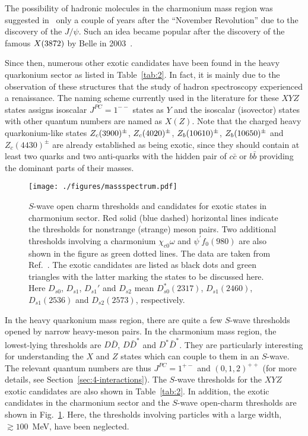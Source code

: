 The possibility of hadronic molecules in the charmonium mass region was 
suggested in~\cite{Voloshin:1976ap,DeRujula:1976zlg} only a couple of years  
after the ``November Revolution'' due to the discovery of the $J/\psi$. Such 
an idea became popular after the discovery of the famous $X(3872)$ by Belle in
2003~\cite{Choi:2003ue}.

Since then, numerous other exotic candidates have been found in the heavy
quarkonium sector as listed in Table~\ref{tab:2}. In fact, it is mainly due to 
the observation of these structures that the study of hadron spectroscopy 
experienced a renaissance.
The naming scheme currently used in the literature for these $XYZ$ states 
assigns isoscalar $J^{PC}=1^{--}$ states as $Y$ and
the isoscalar (isovector) states with other quantum numbers are named as $X 
(Z)$. Note that the charged heavy quarkonium-like states $Z_c(3900)^\pm$, 
$Z_c(4020)^\pm$, $Z_b(10610)^\pm$, $Z_b(10650)^\pm$ and $Z_c
(4430)^\pm$ are already established as being exotic, since they should contain 
at least two quarks and two anti-quarks with the hidden pair of $c\bar c$ or 
$b\bar b$ providing the dominant parts of their masses.


\begin{figure}[tbh]
\begin{center}
 \texttt{[image: ./figures/massspectrum.pdf]}
\caption{$S$-wave open charm thresholds and candidates for exotic states in 
charmonium sector. Red solid (blue dashed)
 horizontal lines indicate the thresholds for nonstrange (strange) meson pairs.
 Two additional thresholds involving a charmonium $\chi_{c0}\omega$ and
 $\psi^\prime f_0(980)$ are also shown in the figure as green dotted lines.
The data are taken from Ref.~\cite{Olive:2016xmw}. The exotic candidates
are listed as black dots and green triangles with the latter marking the states 
to be discussed here. Here $D_{s0}^{}$,
$D_{s1}^{}$, $D_{s1}'$ and $D_{s2}^{}$ mean $D_{s0}^*(2317)$, $D_{s1}^{}(2460)$, 
$D_{s1}^{}(2536)$ and $D_{s2}^{}(2573)$, respectively.}
\label{fig:charmoniumlike}
\end{center}
\end{figure}
In the heavy quarkonium mass region, there are quite a few $S$-wave thresholds 
opened by narrow heavy-meson pairs. In the charmonium mass region, the
lowest-lying thresholds are  $D\bar{D}$, $D\bar{D}^*$ and 
$D^*\bar{D}^*$. They are particularly interesting for understanding the 
$X$ and $Z$ states which can couple to them in an $S$-wave. The relevant 
quantum numbers are thus $J^{PC}=1^{+-}$ and $(0,1,2)^{++}$ (for more details, 
see Section~\ref{sec:4-interactions}). 
The $S$-wave thresholds for the $XYZ$ exotic candidates are also shown in 
Table~\ref{tab:2}. In addition,
the exotic candidates in the charmonium sector and the $S$-wave open-charm 
thresholds are shown in Fig.~\ref{fig:charmoniumlike}. Here, the thresholds 
involving particles with a large width, $\gtrsim100$~MeV, have been neglected.

